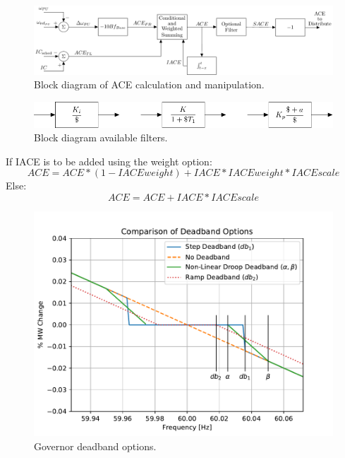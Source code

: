 \documentclass[12pt]{article}
\begin{document}
\begin{figure}[!ht]
	\centering
	\footnotesize
	\includegraphics[width=\linewidth]{../../models/AGC-TLB/AGC-TLB}
	\caption{Block diagram of ACE calculation and manipulation.}
	\label{fig: AGC-TLB}
\end{figure}\vspace{-1em} %

\begin{figure}[!ht]
	\centering
	\footnotesize
	\includegraphics[width=.8\linewidth]{../../models/filterAgents/filterAgent}
	\caption{Block diagram available filters.}
	\label{fig: filterAgents}
\end{figure}\vspace{-1em} %




If IACE is to be added using the weight option:
\[ACE = ACE*(1-IACEweight)+ IACE*IACEweight*IACEscale\]
Else:
\[ACE = ACE+IACE*IACEscale\]


\begin{figure}[!ht]
	\centering
	\footnotesize
	\includegraphics[width=.5\linewidth]{dbAction}
	\caption{Governor deadband options.}
	\label{fig: dbAction}
\end{figure}\vspace{-1em} %


\pagebreak
\end{document}
